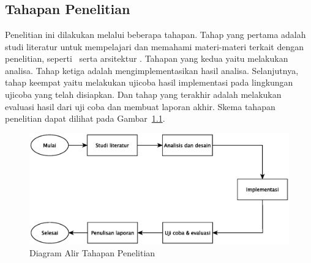 \chapter{\babTiga}

\section{Tahapan Penelitian}

Penelitian ini dilakukan melalui beberapa tahapan. Tahap yang pertama
adalah studi literatur untuk mempelajari dan memahami materi-materi terkait
dengan penelitian, seperti \tracking~serta arsitektur \pubsub. Tahapan yang
kedua yaitu melakukan analisa. Tahap ketiga adalah mengimplementasikan hasil
analisa. Selanjutnya, tahap keempat yaitu melakukan ujicoba hasil implementasi
pada lingkungan ujicoba yang telah disiapkan. Dan tahap yang terakhir adalah
melakukan evaluasi hasil dari uji coba dan membuat laporan akhir. Skema tahapan
penelitian dapat dilihat pada Gambar~\ref{fig:tahapan}.

\noindent
\begin{figure}
  \centering
  \includegraphics[scale=0.60]
  {images/3-tahapan}
\caption{Diagram Alir Tahapan Penelitian}
\label{fig:tahapan}
\end{figure}

